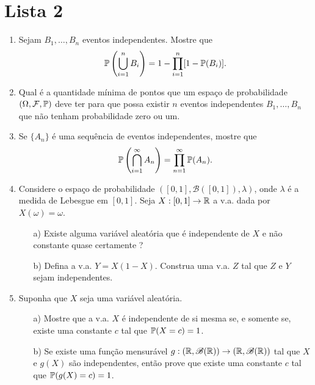 \chapter*{Lista 2}
\chaptermark{}


\begin{enumerate}[leftmargin=*]


\item 
Sejam $B_1,\ldots, B_n$ eventos independentes. 
Mostre que 
	\[
		\P \left( \bigcup_{i=1}^n B_i \right)
		=
		1- \prod_{i=1}^n [1-\P(B_i)].
	\]


\item 
Qual é a quantidade mínima de pontos que um espaço de
probabilidade $(\Omega,\F,\P)$ deve ter para que possa
existir $n$ eventos independentes $B_1,\ldots,B_n$ 
que não tenham probabilidade zero ou um. 


\item Se $\{A_n\}$ é uma sequência de eventos independentes,
mostre que 
	\[
		\P \left( \bigcap_{i=1}^{\infty} A_n \right)
		=
		\prod_{n=1}^{\infty} \P(A_n).
	\]



\item 
Considere o espaço de probabilidade $([0,1],\mathscr{B}([0,1]),\lambda)$,
onde $\lambda$ é a medida de Lebesgue em $[0,1]$.
Seja $X:[0,1]\to\R$ a v.a. dada por $X(\omega)=\omega$.
	\begin{itemize}
		\item[a)]
		Existe alguma variável aleatória que é independente de 
		$X$ e não constante quase certamente ?
		
		\item[b)] Defina a v.a. $Y=X(1-X)$. Construa uma v.a.
		$Z$ tal que $Z$ e $Y$ sejam independentes.
	\end{itemize}



\item 
Suponha que $X$ seja uma variável aleatória.
	\begin{itemize}
		\item[a)] 
		Mostre que a v.a. $X$ é independente de si mesma 
		se, e somente se, existe uma constante $c$ tal que 
		$\P(X=c)=1$.
		
		\item[b)]
		Se existe uma função mensurável 
		$g:(\R,\mathscr{B}(\R))\to(\R,\mathscr{B}(\R))$
		tal que $X$ e $g(X)$ são independentes, então prove que
		existe uma constante $c$ tal que $\P(g(X)=c)= 1$. 				
	\end{itemize}	 
		

\end{enumerate}
